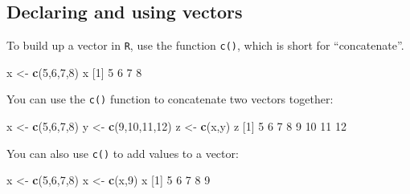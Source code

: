 \documentclass[
]{book}
\newenvironment{Shaded}{\begin{snugshade}}{\end{snugshade}}
\newcommand{\DecValTok}[1]{\textcolor[rgb]{0.00,0.00,0.81}{#1}}
\newcommand{\KeywordTok}[1]{\textcolor[rgb]{0.13,0.29,0.53}{\textbf{#1}}}
\newcommand{\NormalTok}[1]{#1}
\newcommand{\StringTok}[1]{\textcolor[rgb]{0.31,0.60,0.02}{#1}}
\begin{document}
\hypertarget{declaring-and-using-vectors}{%
\subsection*{Declaring and using vectors}\label{declaring-and-using-vectors}}

To build up a vector in \texttt{R}, use the function \texttt{c()}, which is short for ``concatenate''.

\begin{Shaded}
\begin{Highlighting}[]
\NormalTok{x <-}\StringTok{ }\KeywordTok{c}\NormalTok{(}\DecValTok{5}\NormalTok{,}\DecValTok{6}\NormalTok{,}\DecValTok{7}\NormalTok{,}\DecValTok{8}\NormalTok{)}
\NormalTok{x}
\NormalTok{[}\DecValTok{1}\NormalTok{] }\DecValTok{5} \DecValTok{6} \DecValTok{7} \DecValTok{8}
\end{Highlighting}
\end{Shaded}

You can use the \texttt{c()} function to concatenate two vectors together:

\begin{Shaded}
\begin{Highlighting}[]
\NormalTok{x <-}\StringTok{ }\KeywordTok{c}\NormalTok{(}\DecValTok{5}\NormalTok{,}\DecValTok{6}\NormalTok{,}\DecValTok{7}\NormalTok{,}\DecValTok{8}\NormalTok{)}
\NormalTok{y <-}\StringTok{ }\KeywordTok{c}\NormalTok{(}\DecValTok{9}\NormalTok{,}\DecValTok{10}\NormalTok{,}\DecValTok{11}\NormalTok{,}\DecValTok{12}\NormalTok{)}
\NormalTok{z <-}\StringTok{ }\KeywordTok{c}\NormalTok{(x,y)}
\NormalTok{z}
\NormalTok{[}\DecValTok{1}\NormalTok{]  }\DecValTok{5}  \DecValTok{6}  \DecValTok{7}  \DecValTok{8}  \DecValTok{9} \DecValTok{10} \DecValTok{11} \DecValTok{12}
\end{Highlighting}
\end{Shaded}

You can also use \texttt{c()} to add values to a vector:

\begin{Shaded}
\begin{Highlighting}[]
\NormalTok{x <-}\StringTok{ }\KeywordTok{c}\NormalTok{(}\DecValTok{5}\NormalTok{,}\DecValTok{6}\NormalTok{,}\DecValTok{7}\NormalTok{,}\DecValTok{8}\NormalTok{)}
\NormalTok{x <-}\StringTok{ }\KeywordTok{c}\NormalTok{(x,}\DecValTok{9}\NormalTok{)}
\NormalTok{x}
\NormalTok{[}\DecValTok{1}\NormalTok{] }\DecValTok{5} \DecValTok{6} \DecValTok{7} \DecValTok{8} \DecValTok{9}
\end{Highlighting}
\end{Shaded}
\end{document}
